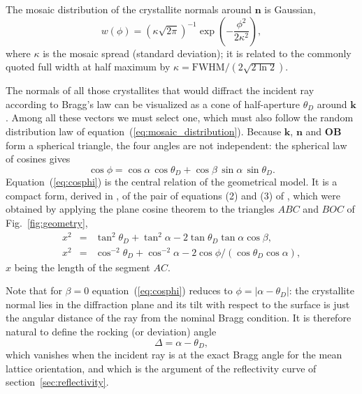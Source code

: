 \documentclass{iucr}
\begin{document}
The mosaic distribution of the crystallite normals around $\mathbf{n}$ is Gaussian,
\begin{equation}
w(\phi) = \left( \kappa \sqrt{2\pi} \right)^{-1} \exp\left( -\frac{\phi^2}{2\kappa^2} \right) ,
\label{eq:mosaic_distribution}
\end{equation}
where $\kappa$ is the mosaic spread (standard deviation); it is related to the
commonly quoted full width at half maximum by
$\kappa = \mathrm{FWHM}/(2\sqrt{2\ln 2})$.

The normals of all those crystallites that would diffract the incident ray
according to Bragg's law can be visualized as a cone of half-aperture $\theta_D$
around $\mathbf{k}$. Among all these vectors we must select one, which must also
follow the random distribution law of
equation~(\ref{eq:mosaic_distribution}). Because $\mathbf{k}$, $\mathbf{n}$ and
$\mathbf{OB}$ form a spherical triangle, the four angles are not independent: the
spherical law of cosines gives
\begin{equation}
\cos\phi = \cos\alpha \, \cos\theta_D + \cos\beta \, \sin\alpha \, \sin\theta_D .
\label{eq:cosphi}
\end{equation}
Equation~(\ref{eq:cosphi}) is the central relation of the geometrical model. It is
a compact form, derived in \cite{mosaicsSanchezDelRio2013}, of the pair of
equations (2) and (3) of \cite{mosaicsSanchezDelRio1992}, which were obtained by
applying the plane cosine theorem to the triangles $ABC$ and $BOC$ of Fig.~\ref{fig:geometry},
\begin{eqnarray}
x^2 &=& \tan^2\theta_D + \tan^2\alpha - 2\tan\theta_D \tan\alpha \cos\beta , \label{eq:abc} \\
x^2 &=& \cos^{-2}\theta_D + \cos^{-2}\alpha - 2 \cos\phi/(\cos\theta_D \cos\alpha) , \label{eq:boc}
\end{eqnarray}
$x$ being the length of the segment $AC$.

Note that for $\beta = 0$ equation~(\ref{eq:cosphi}) reduces to
$\phi = |\alpha - \theta_D|$: the crystallite normal lies in the diffraction plane
and its tilt with respect to the surface is just the angular distance of the ray
from the nominal Bragg condition. It is therefore natural to define the rocking (or
deviation) angle
\begin{equation}
\Delta = \alpha - \theta_D ,
\label{eq:delta}
\end{equation}
which vanishes when the incident ray is at the exact Bragg angle for the mean
lattice orientation, and which is the argument of the reflectivity curve of
section~\ref{sec:reflectivity}.
\end{document}
